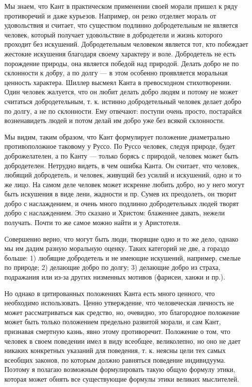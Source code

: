 Мы знаем, что Кант в практическом применении своей морали пришел к
ряду противоречий и даже курьезов. Например, он резко отделяет мораль
от удовольствия и считает, что существом подлинно добродетельным не
является человек, который получает удовольствие в добродетели и жизнь
которого проходит без искушений. Добродетельным человеком является
тот, кто побеждает жестокие искушения благодаря своему характеру и
воле. Добродетель не есть порождение природы, она является победой над
природой. Делать добро не по склонности к добру, а по долгу --- в этом
особенно проявляется моральная ценность характера. Шиллер высмеял
Канта в превосходном стихотворении. Один человек жалуется, что он
любит делать добро людям и потому не может считаться добродетельным,
т. к. истинно добродетельный человек делает добро по долгу, а не по
склонности. Ему отвечают: поступи очень просто, постарайся
возненавидеть людей и потом делай им добро уже без всякой склонности.

Мы видим, таким образом, что Кант формулирует положение диаметрально
противоположное таковому у Руссо. По Руссо человек, следуя природе,
будет доброжелателен, а по Канту --- только борясь с природой, человек
может быть добродетелен. Нетрудно видеть, в чем ошибка Канта. Он
считает, что человек, любящий добродетель, и человек, живущий без
усилий и искушений, одно и то же лицо. На самом деле человек может
искренне любить добро, но у него могут быть искушения в виде лени,
жадности и пр. Сумев их преодолеть, он творит добро с наслаждением, и
очень много подлинно добродетельных людей творят добро с наслаждением.
Это сказано и Христом: блаженнее давать, нежели получать. Почти то же
самое можно найти и у Аристотеля.

Совершенно верно, что могут быть люди, творящие одно и то же дело,
однако мы им дадим разную моральную оценку. Таких категорий не две, а
гораздо больше: 1) любящие добродетель и не имеющие искушений,
например, смелые по природе; 2) делающие добро по долгу; 3) делающие
добро из страха, подражания или из-за других низменных мотивов
(фарисеи, ханжи и пр.).

Но однако в цитированных положениях Канта есть много ценного, что
необходимо использовать. Ценно утверждение, что человеческая личность
не может рассматриваться как средство, но, очевидно, это благородное
положение может быть только положением предельно развитой морали, и
сам Кант, признавая смертную казнь, явно этому противоречит. Положение
о том, что человек в своем поведении имел в виду всеобщее,
великолепно, но оно не дает никаких конкретных указаний для поведения,
т. к. неясны цели тех самых всеобщих законов, по которым должно
равняться поведение индивидуума. Поэтому я полагаю возможным
формулировать такую общую формулу этики, которая может обнять все
существующие формулы этики великих мыслителей.


